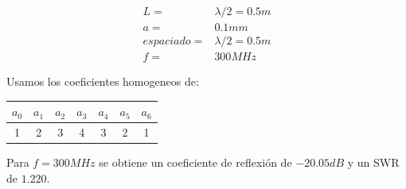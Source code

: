 \documentclass[11pt]{book}
\begin{document}
\begin{align*}
	L = &\lambda/2 =  0.5m \\
	a = & 0.1mm \\
	espaciado = & \lambda / 2 = 0.5m \\
	f = & 300MHz
\end{align*}

Usamos los coeficientes homogeneos de:

\begin{tabular}{c|c|c|c|c|c|c}
	$a_0$ & $a_1$ & $a_2$ & $a_3$ & $a_4$ & $a_5$ & $a_6$ \\ \hline
	1 & 2 & 3 & 4 & 3 & 2 & 1 \\
\end{tabular}

Para $f=300MHz$ se obtiene un coeficiente de reflexión de $-20.05dB$ y un SWR de $1.220$. 
\end{document}

